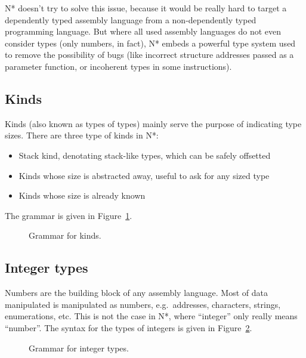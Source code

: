 N* doesn't try to solve this issue, because it would be really hard to target a dependently typed assembly language from a non-dependently typed programming language. But where all used assembly languages do not even consider types (only numbers, in fact), N* embeds a powerful type system used to remove the possibility of bugs (like incorrect structure addresses passed as a parameter function, or incoherent types in some instructions).

\subsection{Kinds}\label{subsec:nstar-common-ts-kinds}

Kinds (also known as types of types) mainly serve the purpose of indicating type sizes.
There are three type of kinds in N*:
\begin{itemize}
  \item Stack kind, denotating stack-like types, which can be safely offsetted
  \item Kinds whose size is abstracted away, useful to ask for any sized type
  \item Kinds whose size is already known
\end{itemize}
The grammar is given in Figure~\ref{fig:nstar-common-ts-kinds-syntax}.

\begin{figure}[htb]
  \centering
  \caption{Grammar for kinds.}
  \label{fig:nstar-common-ts-kinds-syntax}
\end{figure}

\subsection{Integer types}\label{subsec:nstar-common-ts-integer}

Numbers are the building block of any assembly language. Most of data manipulated is manipulated as numbers, e.g.\ addresses, characters, strings, enumerations, etc.
This is not the case in N*, where ``integer''  only really means ``number''.
The syntax for the types of integers is given in Figure~\ref{fig:nstar-common-ts-integer-syntax}.

\begin{figure}[htb]
  \centering
  \caption{Grammar for integer types.}
  \label{fig:nstar-common-ts-integer-syntax}
\end{figure}

